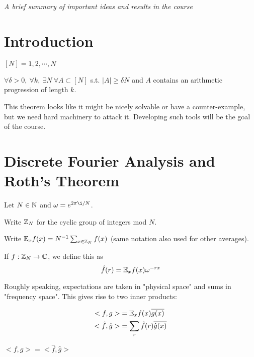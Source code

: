 \documentclass[a4paper]{article}
\begin{document}
\maketitle
{\small \centering
\noindent\emph{A brief summary of important ideas and results in the course}

\setcounter{section}{-1}
\section{Introduction}
$[N] = {1,2,\cdots, N}$

\begin{thm}
	$\forall\delta > 0,\ \forall k,\ \exists N\ \forall A \subset [N]$ s.t. $|A| \geq\delta N$ and $A$ contains an arithmetic progression of length $k$.
\end{thm}

This theorem looks like it might be nicely solvable or have a counter-example, but we need hard machinery to attack it. Developing such tools will be the goal of the course.

\section{Discrete Fourier Analysis and Roth's Theorem}
Let $N\in\mathbb{N}$ and $\omega=e^{2\pi\i/N}$.

Write $\mathbb{Z}_N$ for the cyclic group of integers mod $N$.

Write $\mathbb{E}_xf(x)=N^{-1}\sum_{x\in\mathbb{Z}_N}f(x)$ (same notation also used for other averages).

\begin{defi}
	If $f:\mathbb{Z}_N \rightarrow \mathbb{C}$, we define this as
	$$\hat{f}(r) = \mathbb{E}_xf(x)\omega^{-rx}$$
\end{defi}

Roughly speaking, expectations are taken in "physical space" and sums in "frequency space". This gives rise to two inner products:

\begin{align*}
	<f,g> &= \mathbb{E}_xf(x)\overline{g(x)}\\
	<\hat{f},\hat{g}> &= \sum_{r} \hat{f}(r)\overline{\hat{g}(x)}
\end{align*}

\begin{fact}
	$<f,g> = <\hat{f},\hat{g}>$
\end{fact}

}
\end{document}
